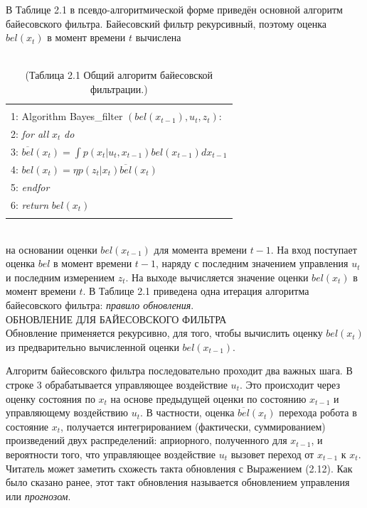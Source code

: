 \documentclass[10pt,a4paper]{article}
\begin{document}
 В Таблице 2.1 в псевдо-алгоритмической форме приведён основной алгоритм байесовского фильтра. Байесовский фильтр рекурсивный, поэтому оценка $bel(x_t)$ в момент времени $t$ вычислена\\ 
 {}\\
  \begin{table}[h]
 	\begin{center}
 		\begin{tabular}{|l|}
 			\hline
 			{}\\
 			1: \hspace{3mm} Algorithm Bayes\_filter $(bel(x_{t-1}), u_t, z_t):$ \\
 			2: \hspace{6mm} \textit{for all} $x_t$ \textit{do} \\
 			3: \hspace{9mm} $\overline{bel}(x_t) =\int p(x_t | u_t, x_{t-1}) bel(x_{t-1}) dx_{t-1}$ \\
 			4: \hspace{9mm} $bel(x_t) =\eta p(z_t | x_t)\overline{bel}(x_t)$\\
 			5: \hspace{6mm} \textit{endfor}\\
 			6: \hspace{3mm} \textit{return} $bel(x_t)$\\
 			{}\\
 			\hline
 		\end{tabular}
 	\caption{(Таблица 2.1 Общий алгоритм байесовской фильтрации.)}
 	\end{center}
 \end{table}\\
 
 на основании оценки $bel(x_{t-1})$ для момента времени ${t-1}$. На вход поступает оценка $bel$ в момент времени ${t-1}$, наряду с последним значением управления $u_t$ и последним измерением  $z_t$. На выходе  вычисляется значение оценки $bel(x_t)$ в момент времени $t$. В Таблице 2.1 приведена одна итерация алгоритма байесовского фильтра: \textit{правило обновления}.\\
 ОБНОВЛЕНИЕ ДЛЯ БАЙЕСОВСКОГО ФИЛЬТРА\\
 Обновление применяется рекурсивно, для того, чтобы вычислить оценку $bel(x_t)$ из предварительно вычисленной оценки $bel(x_{t-1})$.
 
 Алгоритм байесовского фильтра последовательно проходит два важных шага. В строке 3 обрабатывается управляющее воздействие $u_t$. Это происходит через оценку состояния по $x_t$ на основе предыдущей оценки по состоянию $x_{t-1}$ и управляющему воздействию $u_t$. В частности, оценка
 $\overline{bel}(x_t)$ перехода робота в состояние $x_t$, получается интегрированием (фактически, суммированием) произведений двух распределений: априорного, полученного для $x_{t-1}$, и вероятности того, что управляющее воздействие $u_t$ вызовет переход от $x_{t-1}$ к $x_t$. Читатель может заметить схожесть такта обновления с Выражением (2.12). Как было сказано ранее, этот такт обновления называется обновлением управления или \textit{прогнозом}.\\
  
\end{document}
